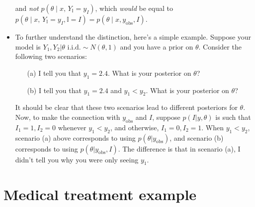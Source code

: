 \documentclass[12pt]{article}
\newcommand{\II}{\mathbb{I}}
\begin{document}
\begin{itemize}
and \textit{not} $p(\theta \mid x,\, Y_\II=y_I)$, which \textit{would} be equal to $p(\theta \mid x,\, Y_\II=y_I,\II=I) = p(\theta \mid x,y_\text{obs},I)$.
\item To further understand the distinction, here's a simple example.  Suppose your model is $Y_1,Y_2|\theta \text{ i.i.d.}\sim N(\theta,1)$ and you have a prior on $\theta$. Consider the following two scenarios:
\begin{enumerate}
\item[(a)] I tell you that $y_1 = 2.4$. What is your posterior on $\theta$?
\item[(b)] I tell you that $y_1 = 2.4$ and $y_1 < y_2$. What is your posterior on $\theta$?
\end{enumerate}
It should be clear that these two scenarios lead to different posteriors for $\theta$. Now, to make the connection with $y_\text{obs}$ and $I$, suppose $p(I|y,\theta)$ is such that $I_1=1,I_2=0$ whenever $y_1 < y_2$, and otherwise, $I_1=0,I_2=1$. When $y_1 < y_2$, scenario (a) above corresponds to using $p(\theta | y_\text{obs})$, and scenario (b) corresponds to using $p(\theta | y_\text{obs}, I)$. The difference is that in scenario (a), I didn't tell you why you were only seeing $y_1$.
\end{itemize}



\section{Medical treatment example}
\end{document}
